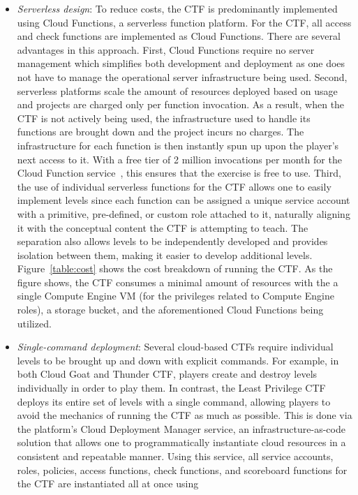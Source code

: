 \begin{itemize}
  \item {\em Serverless design}: To reduce costs, the CTF is predominantly implemented using Cloud Functions, a serverless function platform.  For the CTF, all access and check functions are implemented as Cloud Functions.  There are several advantages in this approach.  First, Cloud Functions require no server management which
  simplifies both development and deployment as one does not have to manage the operational server infrastructure being used.  Second, serverless platforms
  scale the amount of resources deployed based on usage and projects are charged only per function invocation.  As a result, when the CTF is not actively being used, the infrastructure used to handle its functions are brought down and
  the project incurs no charges.  The infrastructure for each function is then instantly spun up upon the player's next access to it.
  With a free tier of 2 million invocations per month for the Cloud Function service~\cite{https://cloud.google.com/free}, this ensures that the exercise
  is free to use.  Third, the use of individual serverless functions for the CTF allows one to easily implement levels since each function can be assigned
  a unique service account with a primitive, pre-defined, or custom role attached to it, naturally aligning it with the conceptual content the CTF is attempting to teach.  The separation also allows levels to be independently developed and provides isolation between them, making it easier to develop additional levels.
  Figure~\ref{table:cost} shows the cost breakdown of running the CTF.  As the figure shows, the CTF consumes a minimal amount of resources with the a single
  Compute Engine VM (for the privileges related to Compute Engine roles), a storage bucket, and the aforementioned Cloud Functions being utilized.
  \item {\em Single-command deployment}: Several cloud-based CTFs require individual levels to be brought up and down with explicit commands.  For example, in both Cloud Goat and Thunder CTF, players create and destroy levels individually in order to play them.  In contrast, the Least Privilege CTF deploys its entire set of levels with a single command, allowing players to avoid the mechanics of running the CTF as much as possible.  This is done via the platform's Cloud Deployment
  Manager service, an infrastructure-as-code solution that allows one to programmatically instantiate cloud resources in a consistent and repeatable manner.  Using
  this service, all service accounts, roles, policies, access functions, check functions, and scoreboard functions for the CTF are instantiated all at once using

\end{itemize}
